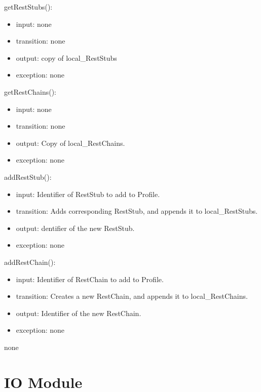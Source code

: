 \documentclass[12pt, titlepage]{article}
\newcommand{\newAccessProgram}[5]{
	\noindent #1:
		\begin{itemize}
		    \item input: #2
			\item transition: #3
			\item output: #4
			\item exception: #5
		\end{itemize}
}
\begin{document}
	{%
		\newAccessProgram{getRestStubs()}
			{%
				none
			}
			{%
				none
			}
			{%
				copy of local\_RestStubs
			}
			{%
				none
			}
		\newAccessProgram{getRestChains()}
			{%
				none
			}
			{%
				none
			}
			{%
				Copy of local\_RestChains.
			}
			{%
				none
			}
			\newAccessProgram{addRestStub()}
			{%
				Identifier of RestStub to add to Profile.
			}
			{%
				Adds corresponding RestStub, and appends it to local\_RestStubs.
			}
			{%
				dentifier of the new RestStub.
			}
			{%
				none
			}
		\newAccessProgram{addRestChain()}
			{%
				Identifier of RestChain to add to Profile.
			}
			{%
				Creates a new RestChain, and appends it to local\_RestChains.
			}
			{%
				Identifier of the new RestChain.
			}
			{%
				none
			}
	}
	{%
		none
	}
	
\newpage


\section {IO Module}

\label{IO}
\end{document}
